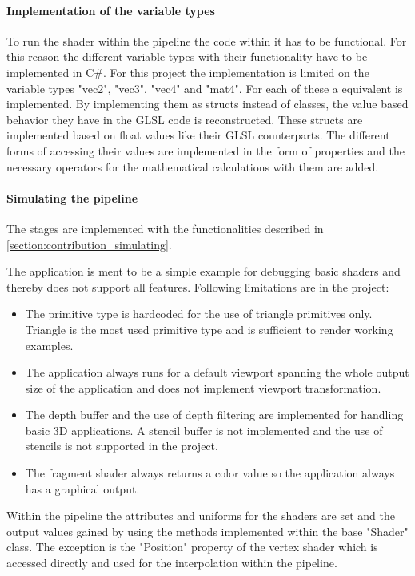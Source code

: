\paragraph{Implementation of the variable types}

To run the shader within the pipeline the code within it has to be functional. For this reason the different variable types with their functionality have to be implemented in C\#. For this project the implementation is limited on the variable types "vec2", "vec3", "vec4" and "mat4". For each of these a equivalent is implemented. By implementing them as structs instead of classes, the value based behavior they have in the GLSL code is reconstructed. These structs are implemented based on float values like their GLSL counterparts. The different forms of accessing their values are implemented in the form of properties and the necessary operators for the mathematical calculations with them are added.

\paragraph{Simulating the pipeline}

The stages are implemented with the functionalities described in \autoref{section:contribution_simulating}.

The application is ment to be a simple example for debugging basic shaders and thereby does not support all features. Following limitations are in the project:
\begin{itemize}
\item The primitive type is hardcoded for the use of triangle primitives only. Triangle is the most used primitive type and is sufficient to render working examples.
\item The application always runs for a default viewport spanning the whole output size of the application and does not implement viewport transformation.
\item The depth buffer and the use of depth filtering are implemented for handling basic 3D applications. A stencil buffer is not implemented and the use of stencils is not supported in the project.
\item The fragment shader always returns a color value so the application always has a graphical output.
\end{itemize}

Within the pipeline the attributes and uniforms for the shaders are set and the output values gained by using the methods implemented within the base "Shader" class. The exception is the "Position" property of the vertex shader which is accessed directly and used for the interpolation within the pipeline.

